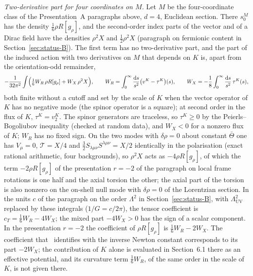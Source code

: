 \emph{Two-derivative part for four coordinates on \(M\).} Let \(M\) be the four-coordinate class of the Presentation~A paragraphs above, \(d=4\), Euclidean section. There \(s_0^M\) has the density \(\tfrac16\rho R[g_\rho]\), and the second-order index parts of the vector and of a Dirac field have the densities \(\rho^2X\) and \(\tfrac12\rho^2X\) (paragraph on fermionic content in Section~\ref{sec:status-B}). The first term has no two-derivative part, and the part of the induced action with two derivatives on \(M\) that depends on \(K\) is, apart from the orientation-odd remainder,
\[
  -\frac1{32\pi^2}\int\Bigl(\tfrac16W_R\,\rho R[g_\rho]+W_X\,\rho^2X\Bigr),\qquad
  W_R=\int_0^\infty\frac{\mathrm ds}{s^2}\bigl(v^K-\tau^K\bigr)(s),\qquad
  W_X=-\frac18\int_0^\infty\frac{\mathrm ds}{s^2}\,\tau^K(s),
\]
both finite without a cutoff and set by the scale of \(K\) when the vector operator of \(K\) has no negative mode (the spinor operator is a square); at second order in the flux of \(K\), \(\tau^K=v_2^K\). The spinor generators are traceless, so \(\tau^K\ge0\) by the Peierls--Bogoliubov inequality (checked at random data), and \(W_X<0\) for a nonzero flux of \(K\); \(W_R\) has no fixed sign. On the two modes with \(\delta\rho=0\) about constant \(\bar\Theta\) one has \(V_\mu=0\), \(\mathcal T=X/4\) and \(\tfrac32S_{\lambda\mu\nu}S^{\lambda\mu\nu}=X/2\) identically in the polarisation (exact rational arithmetic, four backgrounds), so \(\rho^2X\) acts as \(-4\rho R[g_\rho]\), of which the term \(-2\rho R[g_\rho]\) of the presentation \(r=-2\) of the paragraph on local frame rotations is one half and the axial torsion the other; the axial part of the torsion is also nonzero on the on-shell null mode with \(\delta\rho=0\) of the Lorentzian section. In the units \(c\) of the paragraph on the order \(\Lambda^2\) in Section~\ref{sec:status-B}, with \(\Lambda_{\mathrm{UV}}^2\) replaced by these integrals (\(1/G=c/2\pi\)), the tensor coefficient is \(c_T=\tfrac16W_R-4W_X\); the mixed part \(-4W_X>0\) has the sign of a scalar component. In the presentation \(r=-2\) the coefficient of \(\rho R[g_\rho]\) is \(\tfrac16W_R-2W_X\). The coefficient that~\cite{Steinacker2023} identifies with the inverse Newton constant corresponds to its part \(-2W_X\); the contribution of \(K\) alone is evaluated in Section~6.1 there as an effective potential, and its curvature term \(\tfrac16W_R\), of the same order in the scale of \(K\), is not given there.

